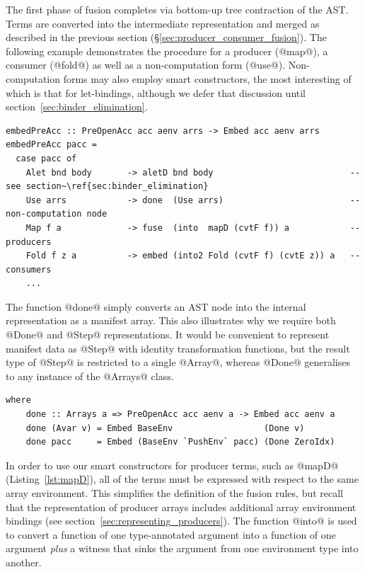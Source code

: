 The first phase of fusion completes via bottom-up tree contraction of the
AST. Terms are converted into the intermediate
representation and merged as described in the previous section
(\S\ref{sec:producer_consumer_fusion}). The following example demonstrates the
procedure for a producer (@map@), a consumer (@fold@) as well as a
non-computation form (@use@). Non-computation forms may also employ smart
constructors, the most interesting of which is that for let-bindings, although
we defer that discussion until section~\ref{sec:binder_elimination}.
%
\begin{lstlisting}[style=haskell
    ,name=embedPreAcc
    ,label=lst:embedPreAcc
    ,caption={[Producer fusion via bottom-up contraction of the AST]}]
embedPreAcc :: PreOpenAcc acc aenv arrs -> Embed acc aenv arrs
embedPreAcc pacc =
  case pacc of
    Alet bnd body       -> aletD bnd body                           -- see section~\ref{sec:binder_elimination}
    Use arrs            -> done  (Use arrs)                         -- non-computation node
    Map f a             -> fuse  (into  mapD (cvtF f)) a            -- producers
    Fold f z a          -> embed (into2 Fold (cvtF f) (cvtE z)) a   -- consumers
    ...
\end{lstlisting}

The function @done@ simply converts an AST node into the internal
representation as a manifest array. This also illustrates why we require both
@Done@ and @Step@ representations. It would be convenient to represent
manifest data as @Step@ with identity transformation functions, but the
result type of @Step@ is restricted to a single @Array@, whereas
@Done@ generalises to any instance of the @Arrays@ class.

\begin{lstlisting}[style=haskell,name=embedPreAcc]
  where
    done :: Arrays a => PreOpenAcc acc aenv a -> Embed acc aenv a
    done (Avar v) = Embed BaseEnv                  (Done v)
    done pacc     = Embed (BaseEnv `PushEnv` pacc) (Done ZeroIdx)
\end{lstlisting}

In order to use our smart constructors for producer terms, such as @mapD@
(Listing~\ref{lst:mapD}), all of the terms must be expressed with respect to the
same array environment. This simplifies the definition of the fusion rules, but
recall that the representation of producer arrays includes additional array
environment bindings (see section~\ref{sec:representing_producers}). The
function @into@ is used to convert a function of one type-annotated
argument into a function of one argument \emph{plus} a witness that sinks the
argument from one environment type into another.

